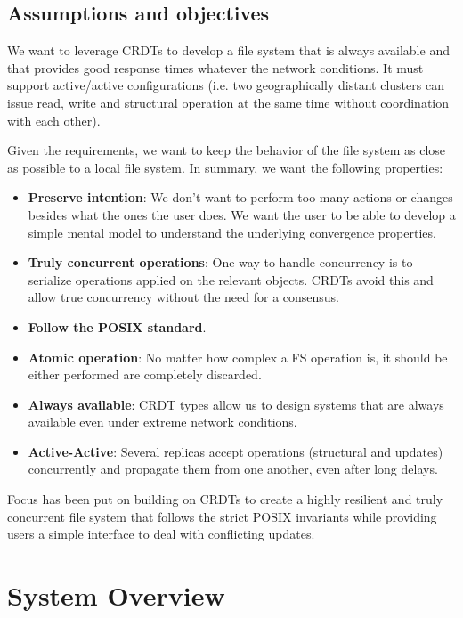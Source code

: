 \documentclass[sigconf,anonymous,10pt]{acmart}
\begin{document}
\subsection{Assumptions and objectives}

We want to leverage CRDTs to develop a file system that is always available
and that provides good response times whatever the network conditions.
It must support active/active configurations
(i.e. two geographically distant clusters can issue read, write and structural
operation at the same time without coordination with each other).

Given the requirements, we want to keep the behavior of the file system as
close as possible to a local file system.
In summary, we want the following properties:

\begin{itemize}
	\item \textbf{Preserve intention}: We don’t want to perform too many actions
	or changes besides what the ones the user does. We want the user to be able
	to develop a simple mental model to understand the underlying convergence
	properties.
	\item \textbf{Truly concurrent operations}: One way to handle concurrency
	is to serialize operations applied on the relevant objects.
	CRDTs avoid this and allow true concurrency without the need for
	a consensus.
	\item \textbf{Follow the POSIX standard}.
	\item \textbf{Atomic operation}: No matter how complex a FS operation is,
		  it should be either performed are completely discarded.
	\item \textbf{Always available}: CRDT types allow us to design systems that
	are always available even under extreme network conditions.
	\item \textbf{Active-Active}: Several replicas accept operations
	(structural and updates) concurrently and propagate them from one another,
	even after long delays.
\end{itemize}

Focus has been put on building on CRDTs to create a highly resilient and truly
concurrent file system that follows the strict POSIX invariants
while providing users a simple interface to deal with conflicting updates.

\section{System Overview}
\end{document}
